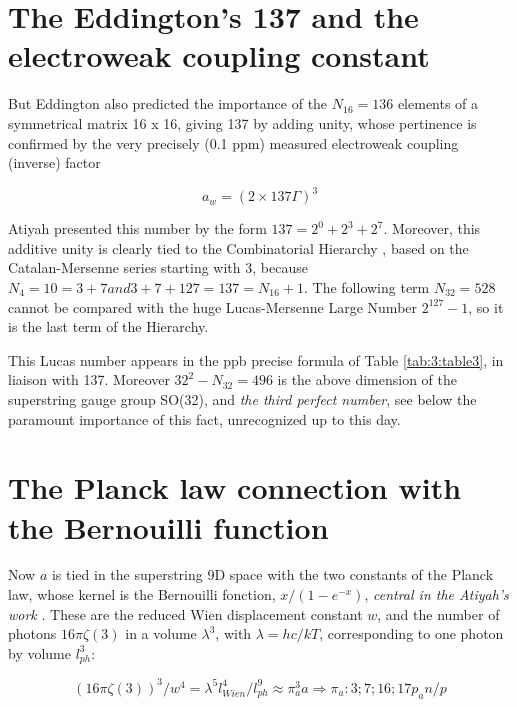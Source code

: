 \documentclass[a4paper,9pt]{article}
\begin{document}
\section{The Eddington's 137 and the electroweak coupling constant}

But Eddington also predicted the importance of the $N_{16} = 136$ elements of a symmetrical matrix 16 x 16, giving 137 by adding unity, whose pertinence is confirmed by the very precisely (0.1 ppm) measured electroweak coupling (inverse) factor 

\begin{equation}
a_w = (2\times137 \Gamma)^3
\end{equation}
 
Atiyah presented this number by the form $137 = 2^0 + 2^3 + 2^7$. Moreover, this additive unity is clearly tied to the Combinatorial Hierarchy \cite{Bastin}, based on the Catalan-Mersenne series starting with 3, because $N_4 = 10 = 3 + 7 and 3+7 + 127 = 137 = N_{16} + 1$. The following term $N_{32}  = 528$ cannot be compared with the huge Lucas-Mersenne Large Number $2^{127}- 1$, so it is the last term of the Hierarchy. 

This Lucas number appears in the ppb precise formula of Table \ref{tab:3:table3}, in liaison with 137. Moreover $32^2 - N_{32} =  496$ is the above dimension of the superstring gauge group SO(32), and \textit {the third perfect number}, see below the paramount importance of this fact, unrecognized up to this day.









\section{The Planck law connection with the Bernouilli function}

Now $a$ is tied in the superstring 9D space with the two constants of the Planck law, whose kernel is the Bernouilli fonction, $x/(1-e^{-x})$, \textit {central in the Atiyah's work} \cite{Atiyah}. These are the reduced Wien displacement constant $w$, and the number of photons $16\pi \zeta(3)$ in a volume $\lambda^3$, with $\lambda = hc/kT $, corresponding to one photon by volume $l_{ph}^3$:

\begin{equation}
(16\pi\zeta(3))^3/w^4 = \lambda^5l_{Wien}^4/l_{ph}^9 \approx \pi_a^3a    \Rightarrow     \pi_a: 3;7;16;17p_an/p
\end{equation}
\end{document}
